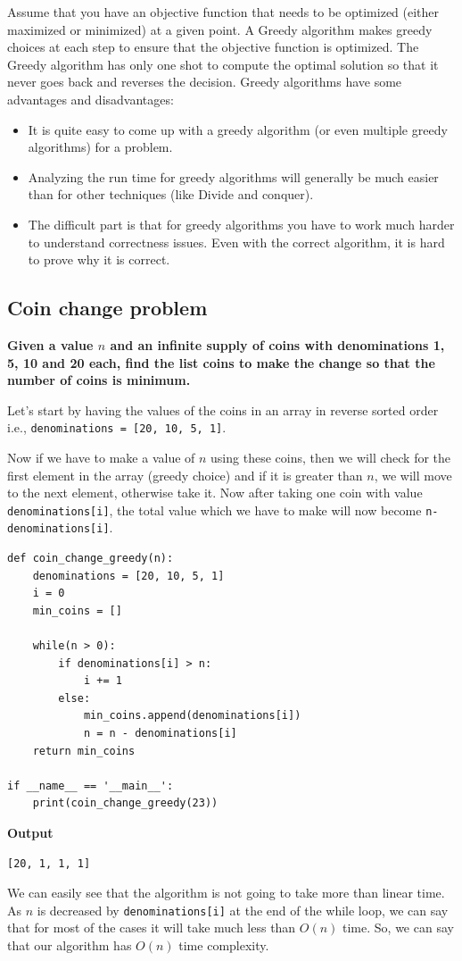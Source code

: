 \documentclass[a4paper,11pt]{book}
\begin{document}
\noindent Assume that you have an objective function that needs to be optimized (either maximized or minimized) at a given point. A Greedy algorithm makes greedy choices at each step to ensure that the objective function is optimized. The Greedy algorithm has only one shot to compute the optimal solution so that it never goes back and reverses the decision. Greedy algorithms have some advantages and disadvantages:
\begin{itemize}
    \item It is quite easy to come up with a greedy algorithm (or even multiple greedy algorithms) for a problem.
    \item Analyzing the run time for greedy algorithms will generally be much easier than for other techniques (like Divide and conquer).
    \item The difficult part is that for greedy algorithms you have to work much harder to understand correctness issues. Even with the correct algorithm, it is hard to prove why it is correct.
\end{itemize}

\subsection{Coin change problem}

\noindent \textbf{Given a value $n$ and an infinite supply of coins with denominations 1, 5, 10 and 20 each, find the list coins to make the change so that the number of coins is minimum.}
\vspace{5mm}

\noindent Let's start by having the values of the coins in an array in reverse sorted order i.e., \lstinline{denominations = [20, 10, 5, 1]}.

\noindent Now if we have to make a value of $n$ using these coins, then we will check for the first element in the array (greedy choice) and if it is greater than $n$, we will move to the next element, otherwise take it. Now after taking one coin with value \lstinline{denominations[i]}, the total value which we have to make will now become \lstinline{n-denominations[i]}.

\begin{lstlisting}
def coin_change_greedy(n):
    denominations = [20, 10, 5, 1]
    i = 0
    min_coins = []

    while(n > 0):
        if denominations[i] > n:
            i += 1
        else:
            min_coins.append(denominations[i])
            n = n - denominations[i]
    return min_coins

if __name__ == '__main__':
    print(coin_change_greedy(23))
\end{lstlisting}
\textbf{Output}
\begin{lstlisting}
[20, 1, 1, 1]
\end{lstlisting}
\noindent We can easily see that the algorithm is not going to take more than linear time. As $n$ is decreased by \lstinline{denominations[i]} at the end of the while loop, we can say that for most of the cases it will take much less than $O(n)$ time. So, we can say that our algorithm has $O(n)$ time complexity.
\end{document}
